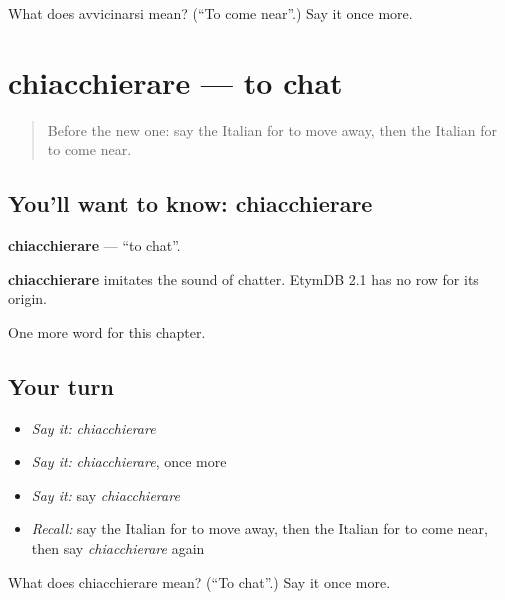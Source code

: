\begin{tcolorbox}[breakable,colback=teal!4,colframe=teal!35!black,title={Before you move on}]
What does avvicinarsi mean? (\textquotedblleft{}To come near\textquotedblright{}.) Say it once more.
\end{tcolorbox}
\section[chiacchierare]{chiacchierare — to chat}

\label{lesson:IT-C212-chiacchierare}



\begin{quote}
Before the new one: say the Italian for to move away, then the Italian for to come near.
\end{quote}

\subsection*{You'll want to know: chiacchierare}
\textbf{chiacchierare} — \textquotedblleft{}to chat\textquotedblright{}.

\begin{cousinweb}
\textbf{chiacchierare} imitates the sound of chatter. EtymDB 2.1 has no row for its origin.
\end{cousinweb}

\begin{grammarlens}[title={What you've built}]
One more word for this chapter.
\end{grammarlens}

\subsection*{Your turn}
\begin{itemize}
\raggedright
  \item \emph{Say it:} \emph{chiacchierare}
  \item \emph{Say it:} \emph{chiacchierare}, once more
  \item \emph{Say it:} say \emph{chiacchierare}
  \item \emph{Recall:} say the Italian for to move away, then the Italian for to come near, then say \emph{chiacchierare} again
\end{itemize}

\begin{tcolorbox}[breakable,colback=teal!4,colframe=teal!35!black,title={Before you move on}]
What does chiacchierare mean? (\textquotedblleft{}To chat\textquotedblright{}.) Say it once more.
\end{tcolorbox}
